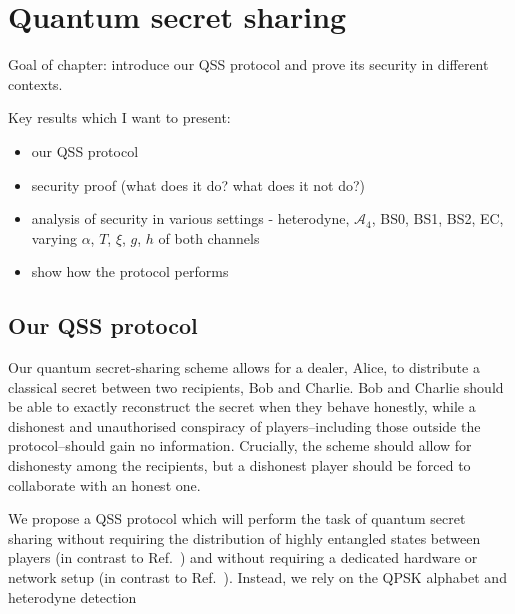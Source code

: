 \chapter{Quantum secret sharing}
Goal of chapter: introduce our QSS protocol and prove its security in different contexts.

Key results which I want to present:
\begin{itemize}
\item our QSS protocol
\item security proof (what does it do? what does it not do?)
\item analysis of security in various settings - heterodyne, $\mathcal{A}_4$, BS0, BS1, BS2, EC, varying $\alpha$, $T$, $\xi$, $g$, $h$ of both channels
\item show how the protocol performs
\end{itemize}


%

\section{Our QSS protocol}

Our quantum secret-sharing scheme allows for a dealer, Alice, to distribute a classical secret between two recipients, Bob and Charlie. Bob and Charlie should be able to exactly reconstruct the secret when they behave honestly, while a dishonest and unauthorised conspiracy of players--including those outside the protocol--should gain no information. Crucially, the scheme should allow for dishonesty among the recipients, but a dishonest player should be forced to collaborate with an honest one.

We propose a QSS protocol which will perform the task of quantum secret sharing without requiring the distribution of highly entangled states between players (in contrast to Ref.~\cite{Kogias2017}) and without requiring a dedicated hardware or network setup (in contrast to Ref.~). Instead, we rely on the QPSK alphabet  and heterodyne detection  


